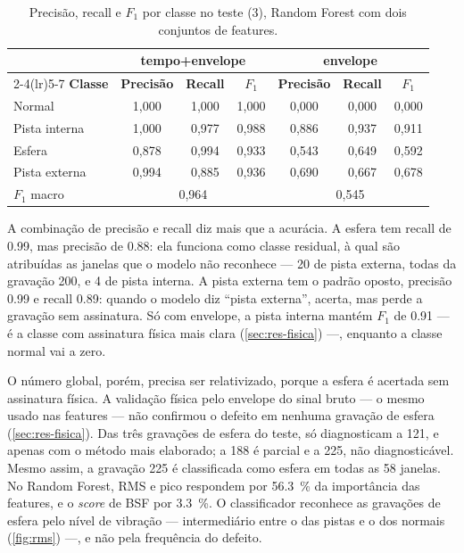 \begin{table}[htb]
  \centering
  \caption{Precisão, recall e $F_1$ por classe no teste (\SI{3}{\hp}), Random
  Forest com dois conjuntos de features.}
  \label{tab:precisao-recall}
  \footnotesize
  \begin{tabular}{lcccccc}
    \toprule
    & \multicolumn{3}{c}{\textbf{tempo+envelope}} & \multicolumn{3}{c}{\textbf{envelope}} \\
    \cmidrule(lr){2-4}\cmidrule(lr){5-7}
    \textbf{Classe} & \textbf{Precisão} & \textbf{Recall} & \textbf{$F_1$} &
    \textbf{Precisão} & \textbf{Recall} & \textbf{$F_1$} \\
    \midrule
    Normal        & 1,000 & 1,000 & 1,000 & 0,000 & 0,000 & 0,000 \\
    Pista interna & 1,000 & 0,977 & 0,988 & 0,886 & 0,937 & 0,911 \\
    Esfera        & 0,878 & 0,994 & 0,933 & 0,543 & 0,649 & 0,592 \\
    Pista externa & 0,994 & 0,885 & 0,936 & 0,690 & 0,667 & 0,678 \\
    \midrule
    $F_1$ macro   & \multicolumn{3}{c}{0,964} & \multicolumn{3}{c}{0,545} \\
    \bottomrule
  \end{tabular}
\end{table}

A combinação de precisão e recall diz mais que a acurácia. A esfera tem recall de
\num{0.99}, mas precisão de \num{0.88}: ela funciona como classe residual, à qual
são atribuídas as janelas que o modelo não reconhece --- 20 de pista externa, todas da
gravação 200, e 4 de pista interna. A pista externa tem o padrão oposto,
precisão \num{0.99} e recall \num{0.89}: quando o modelo diz ``pista externa'',
acerta, mas perde a gravação sem assinatura. Só com envelope, a pista interna
mantém $F_1$ de \num{0.91} --- é a classe com assinatura física mais clara
(\autoref{sec:res-fisica}) ---, enquanto a classe normal vai a zero.

O número global, porém, precisa ser relativizado, porque a esfera é acertada sem
assinatura física. A validação física pelo
envelope do sinal bruto --- o mesmo usado nas features --- não confirmou o defeito
em nenhuma gravação de esfera (\autoref{sec:res-fisica}). Das três gravações de
esfera do teste, \textcite{smith2015} só diagnosticam a 121, e apenas com o
método mais elaborado; a 188 é parcial e a 225, não diagnosticável. Mesmo assim,
a gravação 225 é classificada como esfera em todas as 58 janelas. No Random
Forest, RMS e pico respondem por \SI{56.3}{\percent} da importância das
features, e o \emph{score} de BSF por \SI{3.3}{\percent}. O classificador reconhece as
gravações de esfera pelo nível de vibração --- intermediário entre o das pistas e
o dos normais (\autoref{fig:rms}) ---, e não pela frequência do defeito.

